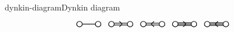 \begin{topic}{dynkin-diagram}{Dynkin diagram}
\[\begin{tikzcd}[column sep=0em, row sep=0em]
\begin{tikzpicture}[scale=.4]
                \draw[thick] (0cm,0) circle (.3cm);
                \draw[thick] (2cm,0) circle (.3cm);
                \draw[thick] (0.3cm,0) -- +(1.4 cm,0);
            \end{tikzpicture} & \begin{tikzpicture}[scale=.4]
                \draw[thick] (0cm,0) circle (.3cm);
                \draw[thick] (2cm,0) circle (.3cm);
                \draw[thick] (0.3cm,0.1cm) -- +(1.4 cm,0cm);
                \draw[thick] (0.3cm,-0.1cm) -- +(1.4 cm,0cm);
                \draw[thick] (0.85cm,0.3cm) -- +(0.3cm,-0.3cm);
                \draw[thick] (0.85cm,-0.3cm) -- +(0.3cm,0.3cm);
            \end{tikzpicture} & \begin{tikzpicture}[scale=.4]
                \draw[thick] (0cm,0) circle (.3cm);
                \draw[thick] (2cm,0) circle (.3cm);
                \draw[thick] (0.3cm,0.1cm) -- +(1.4 cm,0cm);
                \draw[thick] (0.3cm,-0.1cm) -- +(1.4 cm,0cm);
                \draw[thick] (1.15cm,0.3cm) -- +(-0.3cm,-0.3cm);
                \draw[thick] (1.15cm,-0.3cm) -- +(-0.3cm,0.3cm);
            \end{tikzpicture} & \begin{tikzpicture}[scale=.4]
                \draw[thick] (0cm,0) circle (.3cm);
                \draw[thick] (2cm,0) circle (.3cm);
                \draw[thick] (0.3cm,0.15cm) -- +(1.4 cm,0cm);
                \draw[thick] (0.3cm,0cm) -- +(1.4 cm,0cm);
                \draw[thick] (0.3cm,-0.15cm) -- +(1.4 cm,0cm);
                \draw[thick] (0.85cm,0.3cm) -- +(0.3cm,-0.3cm);
                \draw[thick] (0.85cm,-0.3cm) -- +(0.3cm,0.3cm);
            \end{tikzpicture} & \begin{tikzpicture}[scale=.4]
                \draw[thick] (0cm,0) circle (.3cm);
                \draw[thick] (2cm,0) circle (.3cm);
                \draw[thick] (0.3cm,0.15cm) -- +(1.4 cm,0cm);
                \draw[thick] (0.3cm,0cm) -- +(1.4 cm,0cm);
                \draw[thick] (0.3cm,-0.15cm) -- +(1.4 cm,0cm);
                \draw[thick] (1.15cm,0.3cm) -- +(-0.3cm,-0.3cm);
                \draw[thick] (1.15cm,-0.3cm) -- +(-0.3cm,0.3cm);
            \end{tikzpicture}
    \end{tikzcd} \]
\end{topic}

